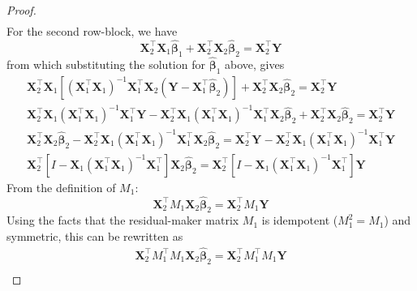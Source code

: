 \documentclass[11pt]{report} %
\begin{document}
\begin{proof}
\begin{align}
\end{align}
For the second row-block, we have
\begin{equation}
\mathbf{X}_{2}^{\top}\mathbf{X}_{1}\widehat{\boldsymbol{\beta}}_{1}+\mathbf{X}_{2}^{\top}\mathbf{X}_{2}\widehat{\boldsymbol{\beta}}_{2}=\mathbf{X}_{2}^{\top}\mathbf{Y}
\end{equation}
from which substituting the solution for $\widehat{\boldsymbol{\beta}}_{1}$ above, gives
\begin{gather}
\mathbf{X}_{2}^{\top}\mathbf{X}_{1}\left[\left(\mathbf{X}_{1}^{\top}\mathbf{X}_{1}\right)^{-1}\mathbf{X}_{1}^{\top}\mathbf{X}_{2}\left(\mathbf{Y}-\mathbf{X}_{1}^{\top}\widehat{\boldsymbol{\beta}}_{2}\right)\right]+\mathbf{X}_{2}^{\top}\mathbf{X}_{2}\widehat{\boldsymbol{\beta}}_{2}=\mathbf{X}_{2}^{\top}\mathbf{Y} \\
\mathbf{X}_{2}^{\top}\mathbf{X}_{1}\left(\mathbf{X}_{1}^{\top}\mathbf{X}_{1}\right)^{-1}\mathbf{X}_{1}^{\top}\mathbf{Y}-\mathbf{X}_{2}^{\top}\mathbf{X}_{1}\left(\mathbf{X}_{1}^{\top}\mathbf{X}_{1}\right)^{-1}\mathbf{X}_{1}^{\top}\mathbf{X}_{2}\widehat{\boldsymbol{\beta}}_{2}+\mathbf{X}_{2}^{\top}\mathbf{X}_{2}\widehat{\boldsymbol{\beta}}_{2}=\mathbf{X}_{2}^{\top}\mathbf{Y} \\
\mathbf{X}_{2}^{\top}\mathbf{X}_{2}\widehat{\boldsymbol{\beta}}_{2}-\mathbf{X}_{2}^{\top}\mathbf{X}_{1}\left(\mathbf{X}_{1}^{\top}\mathbf{X}_{1}\right)^{-1}\mathbf{X}_{1}^{\top}\mathbf{X}_{2}\widehat{\boldsymbol{\beta}}_{2}=\mathbf{X}_{2}^{\top}\mathbf{Y}-\mathbf{X}_{2}^{\top}\mathbf{X}_{1}\left(\mathbf{X}_{1}^{\top}\mathbf{X}_{1}\right)^{-1}\mathbf{X}_{1}^{\top}\mathbf{Y} \\
\mathbf{X}_{2}^{\top}\left[I-\mathbf{X}_{1}\left(\mathbf{X}_{1}^{\top}\mathbf{X}_{1}\right)^{-1}\mathbf{X}_{1}^{\top}\right]\mathbf{X}_{2}\widehat{\boldsymbol{\beta}}_{2}=\mathbf{X}_{2}^{\top}\left[I-\mathbf{X}_{1}\left(\mathbf{X}_{1}^{\top}\mathbf{X}_{1}\right)^{-1}\mathbf{X}_{1}^{\top}\right]\mathbf{Y}
\end{gather}
From the definition of $M_{1}$:
\begin{equation}
\mathbf{X}_{2}^{\top}M_{1}\mathbf{X}_{2}\widehat{\boldsymbol{\beta}}_{2}=\mathbf{X}_{2}^{\top}M_{1}\mathbf{Y}
\end{equation}
Using the facts that the residual-maker matrix $M_{1}$ is idempotent ($M_{1}^{2} = M_{1}$) and symmetric, this can be rewritten as
\begin{gather}
\mathbf{X}_{2}^{\top}M_{1}^{\top}M_{1}\mathbf{X}_{2}\widehat{\boldsymbol{\beta}}_{2}=\mathbf{X}_{2}^{\top}M_{1}^{\top}M_{1}\mathbf{Y} \\

\end{gather}
\end{proof}
\end{document}
